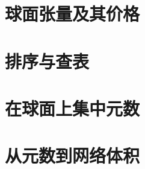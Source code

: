 \documentclass[UTF8,11pt,fontset=fandol,scheme=plain]{ctexart}
\begin{document}
\maketitle

\begin{abstract}
我们证明，在任意域上，方阵乘法的指数都等于 \(9/4\)。此前其上界已经得到证明。对每个 \(n\ge 2\)，计算两个 \(n\times n\) 矩阵乘积的形式算术电路至少需要 \(n^{9/4}/2\) 个乘法门或除法门。证明表明，如果指数更小，就可以把张量网络压缩到足以违反一条已知下界的程度。该下界针对以下判定问题：给定若干彼此独立的列表，判定每个列表内部的元素是否两两不同。
\end{abstract}



\clearpage
{\small\tableofcontents}
\clearpage






\par{}
\part{球面张量及其价格}\label{part:spheres}










\par{}
\part{排序与查表}\label{part:sorting}


\par{}
\part{在球面上集中元数}\label{part:local}


\par{}
\part{从元数到网络体积}\label{part:volume}






\end{document}
